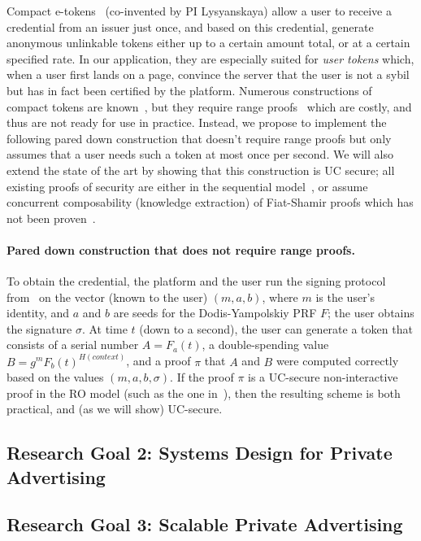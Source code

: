 Compact e-tokens~\cite{EC:camhohlys05,CCS:chklm06} (co-invented by PI Lysyanskaya) allow a user to receive a credential from an issuer just once, and based on this credential, generate anonymous unlinkable tokens either up to a certain amount total, or at a certain specified rate.  In our application, they are especially suited for \emph{user tokens} which, when a user first lands on a page, convince the server that the user is not a sybil but has in fact been certified by the platform.  Numerous constructions of compact tokens are known~\cite{}, but they require range proofs~\cite{} which are costly, and thus are not ready for use in practice.  Instead, we propose to implement the following pared down construction that doesn't require range proofs but only assumes that a user needs such a token at most once per second.  We will also extend the state of the art by showing that this construction is UC secure; all existing proofs of security are either in the sequential model~\cite{}, or assume concurrent composability (knowledge extraction) of Fiat-Shamir proofs which has not been proven~\cite{}.

\paragraph{Pared down construction that does not require range proofs.} To obtain the credential, the platform and the user run the signing protocol from~\cite{C:CamLys04} on the vector (known to the user) $(m,a,b)$, where $m$ is the user's identity, and $a$ and $b$ are seeds for the Dodis-Yampolskiy PRF $F$; the user obtains the signature $\sigma$.  At time $t$ (down to a second), the user can generate a token that consists of a serial number $A=F_a(t)$, a double-spending value $B = g^m F_b(t)^{H(\mathit{context})}$, and a proof $\pi$ that $A$ and $B$ were computed correctly based on the values $(m,a,b,\sigma)$. If the proof $\pi$ is a UC-secure non-interactive proof in the RO model (such as the one in~\cite{lysros22}), then the resulting scheme is both practical, and (as we will show) UC-secure.

\subsection{Research Goal 2: Systems Design for Private Advertising}

\subsection{Research Goal 3: Scalable Private Advertising}

